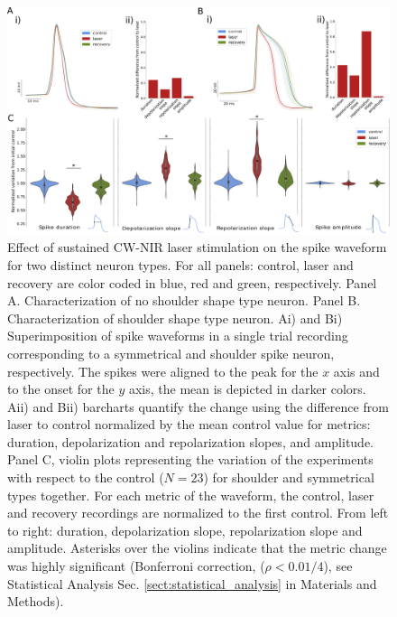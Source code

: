 \begin{figure}[htb!]
	\centering
	\includegraphics[width=\textwidth]{img/laser/Figure2.png}
	\caption{Effect of sustained CW-NIR laser stimulation on the spike waveform for two distinct neuron types. For all panels: control, laser and recovery are color coded in blue, red and green, respectively. Panel A. Characterization of no shoulder shape type neuron. Panel B. Characterization of shoulder shape type neuron. Ai) and Bi) Superimposition of spike waveforms in a single trial recording corresponding to a symmetrical and shoulder spike neuron, respectively. The spikes were aligned to the peak for the $x$ axis and to the onset for the $y$ axis, the mean is depicted in darker colors. Aii) and Bii) barcharts quantify the change using the difference from laser to control normalized by the mean control value for metrics: duration, depolarization and repolarization slopes, and amplitude. Panel C, violin plots representing the variation of the experiments with respect to the control ($N=23$) for shoulder and symmetrical types together. For each metric of the waveform, the control, laser and recovery recordings are normalized to the first control. From left to right: duration, depolarization slope, repolarization slope and amplitude. Asterisks over the violins indicate that the metric change was highly significant (Bonferroni correction, ($\rho<0.01/4$), see Statistical Analysis Sec. \ref{sect:statistical_analysis} in Materials and Methods).}
	\label{fig:continuous_results_panel}
\end{figure}

